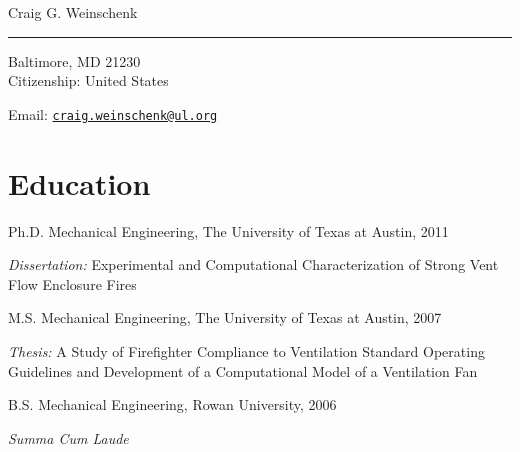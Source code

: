 \documentclass[10pt,letterpaper]{article}
\def\name{Craig G. Weinschenk}
\renewenvironment{itemize}{
  \begin{list}{}{
    \setlength{\leftmargin}{1.5em}
  }
}{
  \end{list}
}
\begin{document}
{\huge \name} \\
\noindent\rule{17cm}{0.4pt}


\vspace{0.25in}

\begin{minipage}[t]{0.5\textwidth}
  Baltimore, MD  21230\\
  Citizenship: United States
\end{minipage}
\begin{minipage}[t]{0.5\textwidth}
  Email: \href{mailto:craig.weinschenk@ul.com} {\tt craig.weinschenk@ul.org}\\

\end{minipage}

\section*{Education}

\begin{itemize}
  \item Ph.D. Mechanical Engineering, The University of Texas at Austin, 2011
    \begin{itemize}
      \item \textit{Dissertation:} Experimental and Computational Characterization of Strong Vent Flow Enclosure Fires
    \end{itemize}

  \item M.S. Mechanical Engineering, The University of Texas at Austin, 2007
    \begin{itemize}
      \item \textit{Thesis:} A Study of Firefighter Compliance to Ventilation Standard Operating Guidelines and Development of a Computational Model of a Ventilation Fan
    \end{itemize}

  \item B.S. Mechanical Engineering, Rowan University, 2006
  \begin{itemize}
    \item \textit{Summa Cum Laude}
  \end{itemize}
\end{itemize}
\end{document}
